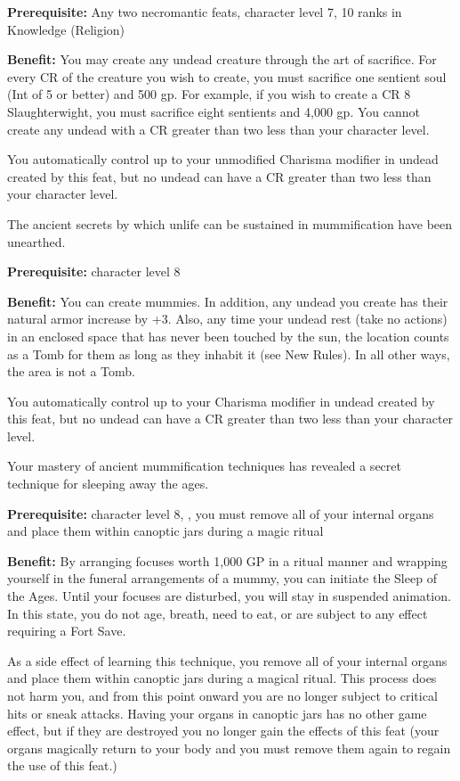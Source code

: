 \textbf{Prerequisite:} Any two necromantic feats, character level 7, 10 ranks in Knowledge (Religion)

\textbf{Benefit:} You may create any undead creature through the art of sacrifice. For every CR of the creature you wish to create, you must sacrifice one sentient soul (Int of 5 or better) and 500 gp. For example, if you wish to create a CR 8 Slaughterwight, you must sacrifice eight sentients and 4,000 gp. You cannot create any undead with a CR greater than two less than your character level. 

You automatically control up to your unmodified Charisma modifier in undead created by this feat, but no undead can have a CR greater than two less than your character level.


The ancient secrets by which unlife can be sustained in mummification have been unearthed.

\textbf{Prerequisite:} character level 8

\textbf{Benefit:} You can create mummies. In addition, any undead you create has their natural armor increase by +3. Also, any time your undead rest (take no actions) in an enclosed space that has never been touched by the sun, the location counts as a Tomb for them as long as they inhabit it (see New Rules). In all other ways, the area is not a Tomb.

You automatically control up to your Charisma modifier in undead created by this feat, but no undead can have a CR greater than two less than your character level.


Your mastery of ancient mummification techniques has revealed a secret technique for sleeping away the ages.

\textbf{Prerequisite:} character level 8, , you must remove all of your internal organs and place them within canoptic jars during a magic ritual

\textbf{Benefit:} By arranging focuses worth 1,000 GP in a ritual manner and wrapping yourself in the funeral arrangements of a mummy, you can initiate the Sleep of the Ages. Until your focuses are disturbed, you will stay in suspended animation. In this state, you do not age, breath, need to eat, or are subject to any effect requiring a Fort Save.

As a side effect of learning this technique, you remove all of your internal organs and place them within canoptic jars during a magical ritual. This process does not harm you, and from this point onward you are no longer subject to critical hits or sneak attacks. Having your organs in canoptic jars has no other game effect, but if they are destroyed you no longer gain the effects of this feat (your organs magically return to your body and you must remove them again to regain the use of this feat.)

